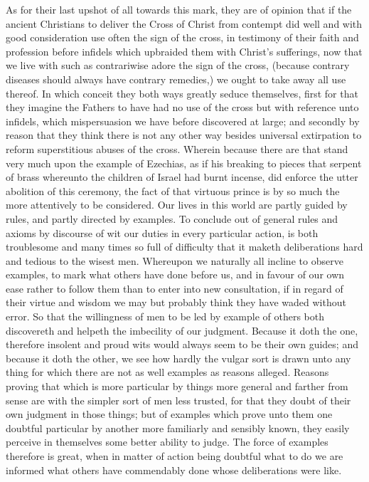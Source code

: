 As for their last upshot of all towards this mark, they are of opinion that if the ancient Christians to deliver the Cross of Christ from contempt did well and with good consideration use often the sign of the cross, in testimony of their faith and profession before infidels which upbraided them with Christ’s sufferings, now that we live with such as contrariwise adore the sign of the cross, (because contrary diseases should always have contrary remedies,) we ought to take away all use thereof. In which conceit they both ways greatly seduce themselves, first for that they imagine the Fathers to have had no use of the cross but with reference unto infidels, which mispersuasion we have before discovered at large; and secondly by reason that they think there is not any other way besides universal extirpation to reform superstitious abuses of the cross. Wherein because there are that stand very much upon the example of Ezechias, as if his breaking to pieces that serpent of brass whereunto the children of Israel had burnt incense, did enforce the utter abolition of this ceremony, the fact of that virtuous prince is by so much the more attentively to be considered.
Our lives in this world are partly guided by rules,  and partly directed by examples.
 To conclude out of general rules and axioms by discourse of wit our duties in every particular action, is both troublesome and many times so full of difficulty that it maketh deliberations hard and tedious to the wisest men. Whereupon we naturally all incline to observe examples, to mark what others have done before us, and in favour of our own ease rather to follow them than to enter into new consultation, if in regard of their virtue and wisdom we may but probably think they have waded without error. So that the willingness of men to be led by example of others both discovereth and helpeth the imbecility of our judgment. Because it doth the one, therefore insolent and proud wits would always seem to be their own guides; and because it doth the other, we see how hardly the vulgar sort is drawn unto any thing for which there are not as well examples as reasons alleged. Reasons proving that which is more particular by things more general and farther from sense are with the simpler sort of men less trusted, for that they doubt of their own judgment in those things; but of examples which prove unto them one doubtful particular by another more familiarly and sensibly known, they easily perceive in themselves some better ability to judge. The force of examples therefore is great, when in matter of action being doubtful what to do we are informed what others have commendably done whose deliberations were like.
